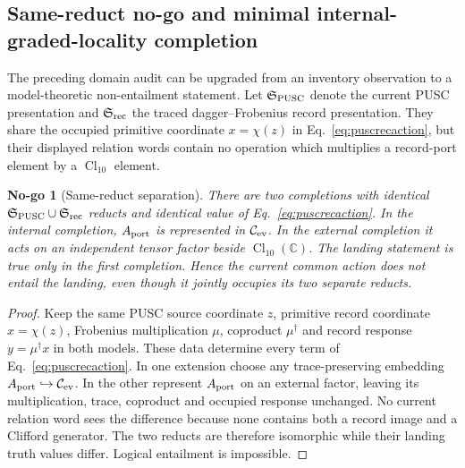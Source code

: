 \documentclass[11pt,a4paper]{article}
\newtheorem{nogo}[definition]{No-go}
\theoremstyle{remark}
\begin{document}
\subsection{Same-reduct no-go and minimal internal-graded-locality completion}

The preceding domain audit can be upgraded from an inventory observation to
a model-theoretic non-entailment statement.  Let $\mathfrak S_{\rm PUSC}$
denote the current PUSC presentation and $\mathfrak S_{\rm rec}$ the traced
dagger--Frobenius record presentation.  They share the occupied primitive
coordinate $x=\chi(z)$ in Eq.~\eqref{eq:puscrecaction}, but their displayed
relation words contain no operation which multiplies a record-port element by
a $\operatorname{Cl}_{10}$ element.

\begin{nogo}[Same-reduct separation]
There are two completions with identical
$\mathfrak S_{\rm PUSC}\cup\mathfrak S_{\rm rec}$ reducts and identical value
of Eq.~\eqref{eq:puscrecaction}.  In the internal completion,
$A_{\rm port}$ is represented in $\mathcal C_{\rm ev}$.  In the external
completion it acts on an independent tensor factor beside
$\operatorname{Cl}_{10}(\mathbb C)$.  The landing statement is true only in
the first completion.  Hence the current common action does not entail the
landing, even though it jointly occupies its two separate reducts.
\end{nogo}

\begin{proof}
Keep the same PUSC source coordinate $z$, primitive record coordinate
$x=\chi(z)$, Frobenius multiplication $\mu$, coproduct $\mu^\dagger$ and
record response $y=\mu^\dagger x$ in both models.  These data determine every
term of Eq.~\eqref{eq:puscrecaction}.  In one extension choose any
trace-preserving embedding
$A_{\rm port}\hookrightarrow\mathcal C_{\rm ev}$.  In the other represent
$A_{\rm port}$ on an external factor, leaving its multiplication, trace,
coproduct and occupied response unchanged.  No current relation word sees
the difference because none contains both a record image and a Clifford
generator.  The two reducts are therefore isomorphic while their landing
truth values differ.  Logical entailment is impossible.
\end{proof}
\end{document}
